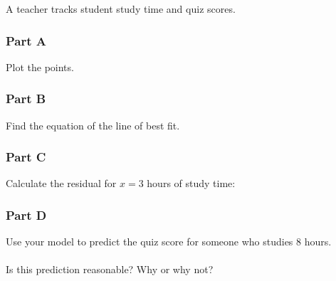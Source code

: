 \documentclass[12pt]{article}
\begin{document}
			A teacher tracks student study time and quiz scores.

			\subsubsection*{Part A}
			
				Plot the points.

                \vspace{1cm}

			\subsubsection*{Part B}

				Find the equation of the line of best fit.

				\vspace{1cm}

			\subsubsection*{Part C}
				
				Calculate the residual for $x = 3$ hours of study time:

				\vspace{1cm}

			\subsubsection*{Part D}
				
				Use your model to predict the quiz score for someone who studies 8 hours.\\\\
                Is this prediction reasonable? Why or why not?
	
\end{document}
